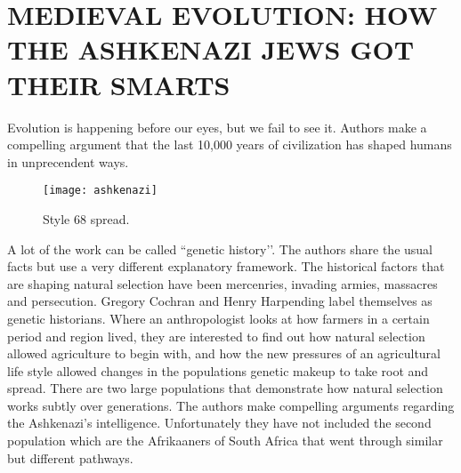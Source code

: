 

\chapter{MEDIEVAL EVOLUTION: HOW THE ASHKENAZI JEWS GOT THEIR SMARTS}

Evolution is happening before our eyes, but we fail to see it. Authors make a compelling argument that the last
10,000 years of civilization has shaped humans in unprecendent ways.

\begin{figure}[ht]
\centering
\texttt{[image: ashkenazi]}
\caption{Style 68 spread.}
\end{figure}

A lot of the work can be called ``genetic history’’. The authors share the usual facts but use a very different explanatory framework. The historical factors that are shaping natural selection have been mercenries, invading armies, massacres and persecution.  Gregory Cochran and Henry Harpending label themselves as genetic historians. Where an anthropologist looks at how farmers in a certain period and region lived, they are interested to find out how natural selection allowed agriculture to begin with, and how the new pressures of an agricultural life style allowed changes in the populations genetic makeup to take root and spread. There are two large populations that
demonstrate how natural selection works subtly over generations. The authors make compelling arguments regarding the Ashkenazi’s intelligence. Unfortunately they have not included the second population which are the Afrikaaners of South Africa that went through similar but different pathways. 

